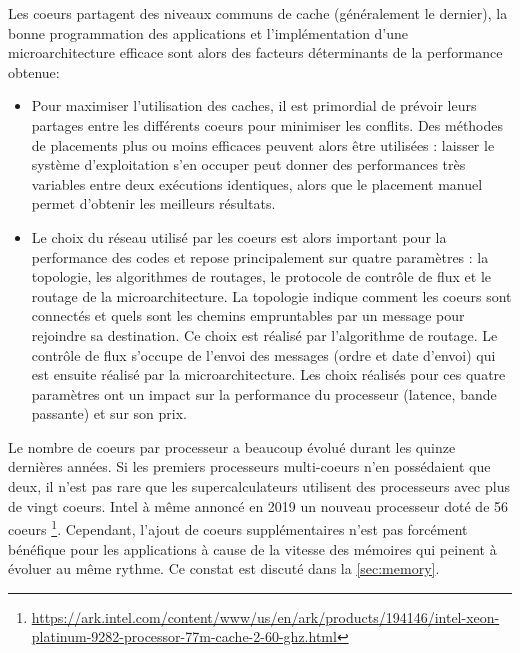             Les coeurs partagent des niveaux communs de cache (généralement le dernier), la bonne programmation des applications et l'implémentation d'une microarchitecture efficace sont alors des facteurs déterminants de la performance obtenue:
            \begin{itemize}
                \item Pour maximiser l'utilisation des caches, il est primordial de prévoir leurs partages entre les différents coeurs pour minimiser les conflits. Des méthodes de placements plus ou moins efficaces peuvent alors être utilisées \cite{mazouz2011performance}: laisser le système d'exploitation s'en occuper peut donner des performances très variables entre deux exécutions identiques, alors que le placement manuel permet d'obtenir les meilleurs résultats. 
                \item Le choix du réseau utilisé par les coeurs est alors important pour la performance des codes et repose principalement sur quatre paramètres \cite{peh2009chip} : la topologie, les algorithmes de routages, le protocole de contrôle de flux et le routage de la microarchitecture. La topologie indique comment les coeurs sont connectés et quels sont les chemins empruntables par un message pour rejoindre sa destination. Ce choix est réalisé par l'algorithme de routage. Le contrôle de flux s'occupe de l'envoi des messages (ordre et date d'envoi) qui est ensuite réalisé par la microarchitecture. Les choix réalisés pour ces quatre paramètres ont un impact sur la performance du processeur (latence, bande passante) et sur son prix. 
            
            \end{itemize}
            
            Le nombre de coeurs par processeur a beaucoup évolué durant les quinze dernières années. Si les premiers processeurs multi-coeurs n'en possédaient que deux, il n'est pas rare que les supercalculateurs utilisent des processeurs avec plus de vingt coeurs. Intel à même annoncé en 2019 un nouveau processeur doté de 56 coeurs \footnote{\url{https://ark.intel.com/content/www/us/en/ark/products/194146/intel-xeon-platinum-9282-processor-77m-cache-2-60-ghz.html}}. Cependant, l'ajout de coeurs supplémentaires n'est pas forcément bénéfique pour les applications à cause de la vitesse des mémoires qui peinent à évoluer au même rythme. Ce constat est discuté dans la \autoref{sec:memory}.